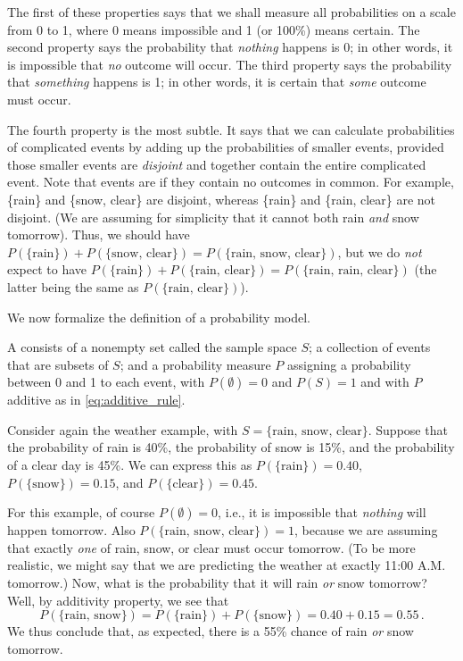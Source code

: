 The first of these properties says that we shall measure all probabilities on a scale from 0 to 1, where 0 means
impossible and 1 (or 100\%) means certain. The second property says the probability that \emph{nothing} happens is 0;
in other words, it is impossible that \emph{no} outcome will occur. The third property says the probability that
\emph{something} happens is 1; in other words, it is certain that \emph{some} outcome must occur.

The fourth property is the most subtle. It says that we can calculate probabilities of complicated events by adding
up  the probabilities of smaller events, provided those smaller events are \emph{disjoint} and together contain the
entire complicated event. Note that events  are  if they contain no outcomes in
common. For example, \{rain\} and \{snow, clear\} are disjoint, whereas \{rain\} and \{rain, clear\} are not
disjoint. (We are assuming for simplicity that it cannot both rain \emph{and} snow tomorrow). Thus, we should have
$P(\{\text{rain}\}) + P(\{\text{snow, clear}\}) = P(\{\text{rain, snow, clear}\})$, but we do \emph{not} expect to
have $P(\{\text{rain}\}) + P(\{\text{rain, clear}\}) = P(\{\text{rain, rain, clear}\})$ (the latter being the same as
$P(\{\text{rain, clear}\})$).

We now formalize the definition of a probability model.
\begin{definition}
    A     consists of a nonempty set called the sample space $S$; a collection of events that
    are subsets of $S$; and a probability measure $P$ assigning a probability between 0 and 1 to each event, with
    $P(\emptyset)=0$ and $P(S)=1$ and with $P$ additive as in \autoref{eq:additive_rule}.
\end{definition}

\begin{example}
    Consider again the weather example, with $S = \{\text{rain, snow, clear}\}$. Suppose that the probability of rain
    is 40\%, the probability of snow is 15\%, and the probability of a clear day is 45\%. We can express this as
    $P(\{\text{rain}\})=0.40$, $P(\{\text{snow}\})=0.15$, and $P(\{\text{clear}\})=0.45$.

    For this example, of course $P(\emptyset)=0$, i.e., it is impossible that \emph{nothing} will happen tomorrow.
    Also $P(\{\text{rain, snow, clear}\})=1$, because we are assuming that exactly \emph{one} of rain, snow, or clear
    must occur tomorrow. (To be more realistic, we might say that we are predicting the weather at exactly 11:00 A.M.
    tomorrow.) Now, what is the probability that it will rain \emph{or} snow tomorrow? Well, by additivity property,
    we see that
    $$
    P(\{\text{rain, snow}\}) = P(\{\text{rain}\}) + P(\{\text{snow}\}) = 0.40 + 0.15 = 0.55\,.
    $$
    We thus conclude that, as expected, there is a 55\% chance of rain \emph{or} snow tomorrow.
\end{example}

